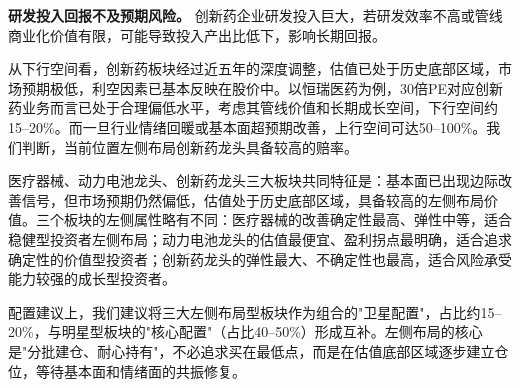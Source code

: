 \textbf{研发投入回报不及预期风险。} 创新药企业研发投入巨大，若研发效率不高或管线商业化价值有限，可能导致投入产出比低下，影响长期回报。

\vspace{0.2cm}

从下行空间看，创新药板块经过近五年的深度调整，估值已处于历史底部区域，市场预期极低，利空因素已基本反映在股价中。以恒瑞医药为例，30倍PE对应创新药业务而言已处于合理偏低水平，考虑其管线价值和长期成长空间，下行空间约15--20\%。而一旦行业情绪回暖或基本面超预期改善，上行空间可达50--100\%。我们判断，当前位置左侧布局创新药龙头具备较高的赔率。

\vspace{0.5cm}

\begin{keyinsight}[左侧布局型板块投资策略总结]
医疗器械、动力电池龙头、创新药龙头三大板块共同特征是：基本面已出现边际改善信号，但市场预期仍然偏低，估值处于历史底部区域，具备较高的左侧布局价值。三个板块的左侧属性略有不同：医疗器械的改善确定性最高、弹性中等，适合稳健型投资者左侧布局；动力电池龙头的估值最便宜、盈利拐点最明确，适合追求确定性的价值型投资者；创新药龙头的弹性最大、不确定性也最高，适合风险承受能力较强的成长型投资者。

配置建议上，我们建议将三大左侧布局型板块作为组合的"卫星配置"，占比约15--20\%，与明星型板块的"核心配置"（占比40--50\%）形成互补。左侧布局的核心是"分批建仓、耐心持有"，不必追求买在最低点，而是在估值底部区域逐步建立仓位，等待基本面和情绪面的共振修复。
\end{keyinsight}


